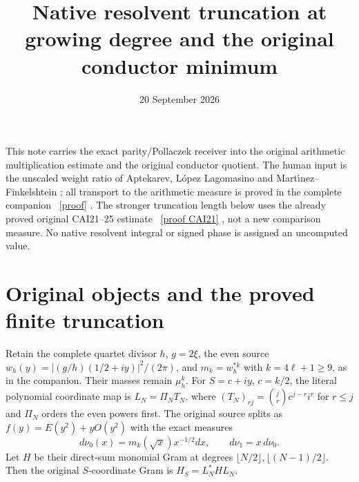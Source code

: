 \documentclass[11pt]{article}
\title{Native resolvent truncation at growing degree and the original conductor minimum}
\author{}
\date{20 September 2026}
\begin{document}
\maketitle
This note carries the exact parity/Pollaczek receiver into the original
arithmetic multiplication estimate and the original conductor quotient.
The human input is the unscaled weight ratio of Aptekarev, L\'opez
Lagomasino and Mart\'{\i}nez--Finkelshtein \cite{ALM}; all transport to
the arithmetic measure is proved in the complete companion \cite{PP}%
~\href{https://github.com/KokunoYumeto/zeta-function-research-reader/blob/5992ad50c0f2a06921f1fcaded7b4e38097c0739/workbenches/splitzero-tandem/continuations/20260920-original-kernel-mixed-determinants/providers/PARITY_POLLACZEK_NATIVE_RECEIVER.tex\#L1}{[proof]}%
{}.
The stronger truncation length below uses the already proved original
CAI21--25 estimate \cite{CAI}%
~\href{https://github.com/KokunoYumeto/zeta-function-research-reader/blob/487253b5b01851da5b9b98af4e146fecf1fab902/workbenches/splitzero-tandem/continuations/20260919-full-window-source-products/providers/CAI_COMPLETE_PREREQUISITE.tex\#L360}{[proof CAI21]}%
{}, not a new comparison measure. No native
resolvent integral or signed phase is assigned an uncomputed value.

\section{Original objects and the proved finite truncation}
Retain the complete quartet divisor $h$, $g=2\xi$, the even source
$w_h(y)=|(g/h)(1/2+iy)|^2/(2\pi)$, and $m_k=w_h^{*k}$ with
$k=4\ell+1\ge9$, as in the companion. Their masses remain
$\mu_h^k$. For $S=c+iy$, $c=k/2$, the literal polynomial coordinate
map is $L_N=\Pi_NT_N$, where
$(T_N)_{rj}=\binom jr c^{j-r}i^r$ for $r\le j$ and $\Pi_N$ orders
the even powers first. The original source splits as
$f(y)=E(y^2)+yO(y^2)$ with the exact measures
\[
 d\nu_0(x)=m_k(\sqrt x)x^{-1/2}dx,\qquad d\nu_1=x\,d\nu_0.
\]
Let $H$ be their direct-sum monomial Gram at degrees
$\lfloor N/2\rfloor,\lfloor(N-1)/2\rfloor$. Then the original
$S$-coordinate Gram is $H_S=L_N^*HL_N$.
\end{document}
